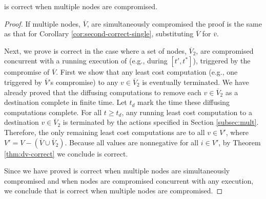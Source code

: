 \begin{corollary}
\label{cor:second-correct-mult}
\second is correct when multiple nodes are compromised.
\end{corollary}
\begin{proof}
If multiple nodes, $\overline{V}$, are simultaneously compromised the proof is the same as that for Corollary \ref{cor:second-correct-single}, substituting $\overline{V}$ for $\overline{v}$.

Next, we prove \second is correct in the case where a set of nodes, $\overline{V}_2$, are compromised concurrent with a running execution of \second (e.g., during  $[t',t^*]$), triggered by the compromise of $\overline{V}$.
First we show that any least cost computation (e.g., one triggered by  $\overline{V}$'s compromise) to any $v \in \overline{V}_2$ is eventually terminated.  We have already proved that the diffusing computations to remove each $v \in \overline{V}_2$ as 
a destination complete in finite time.  Let $t_d$ mark the time these diffusing computations complete. For all $t \geq t_d$, any running least cost computation to a destination $v \in \overline{V}_2$ 
is terminated by the actions specified in Section \ref{subsec:mult}.  Therefore, the only remaining least cost computations are to all $v \in V'$, where 
$V' = V - \left(\overline{V} \cup \overline{V}_2 \right)$.  Because all \dmatrixi values are nonnegative for all $i \in V'$, by Theorem \ref{thm:dv-correct} we conclude \second is correct.

Since we have proved \second is correct when multiple nodes are simultaneously compromised and when nodes are compromised concurrent with any \second execution,
we conclude that \second is correct when multiple nodes are compromised.
\end{proof}


